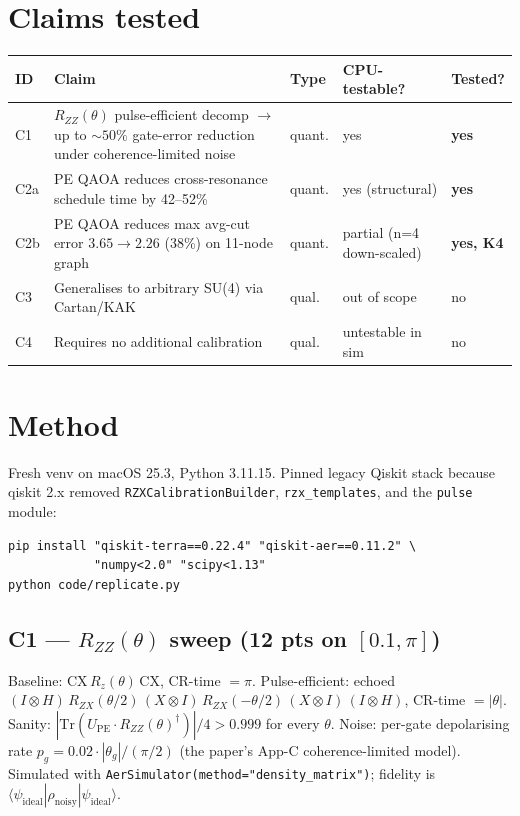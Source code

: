 \documentclass[11pt]{article}
\begin{document}
\section{Claims tested}
\begin{longtable}{@{}p{0.5cm} p{6cm} p{1.8cm} p{2cm} p{2.2cm}@{}}
\toprule
ID & Claim & Type & CPU-testable? & Tested? \\
\midrule
C1 & $R_{ZZ}(\theta)$ pulse-efficient decomp $\to$ up to $\sim 50\%$ gate-error reduction under coherence-limited noise & quant. & yes & \textbf{yes} \\
C2a & PE QAOA reduces cross-resonance schedule time by 42--52\% & quant. & yes (structural) & \textbf{yes} \\
C2b & PE QAOA reduces max avg-cut error $3.65\to 2.26$ (38\%) on 11-node graph & quant. & partial (n=4 down-scaled) & \textbf{yes, K4} \\
C3 & Generalises to arbitrary SU(4) via Cartan/KAK & qual. & out of scope & no \\
C4 & Requires no additional calibration & qual. & untestable in sim & no \\
\bottomrule
\end{longtable}

\section{Method}
Fresh venv on macOS 25.3, Python 3.11.15. Pinned legacy Qiskit stack
because qiskit 2.x removed \texttt{RZXCalibrationBuilder},
\texttt{rzx\_templates}, and the \texttt{pulse} module:

\begin{verbatim}
pip install "qiskit-terra==0.22.4" "qiskit-aer==0.11.2" \
            "numpy<2.0" "scipy<1.13"
python code/replicate.py
\end{verbatim}

\subsection{C1 --- $R_{ZZ}(\theta)$ sweep (12 pts on $[0.1,\pi]$)}
Baseline: $\mathrm{CX}\,R_z(\theta)\,\mathrm{CX}$, CR-time $= \pi$.
Pulse-efficient: echoed $(I\!\otimes\! H)\,R_{ZX}(\theta/2)\,(X\!\otimes\!
I)\,R_{ZX}(-\theta/2)\,(X\!\otimes\! I)\,(I\!\otimes\! H)$, CR-time $=
|\theta|$. Sanity: $|\mathrm{Tr}(U_{\mathrm{PE}}\cdot
R_{ZZ}(\theta)^\dagger)|/4>0.999$ for every $\theta$.
Noise: per-gate depolarising rate $p_g = 0.02\cdot|\theta_g|/(\pi/2)$
(the paper's App-C coherence-limited model). Simulated with
\texttt{AerSimulator(method="density\_matrix")}; fidelity is
$\langle\psi_{\mathrm{ideal}}|\rho_{\mathrm{noisy}}|\psi_{\mathrm{ideal}}\rangle$.
\end{document}
